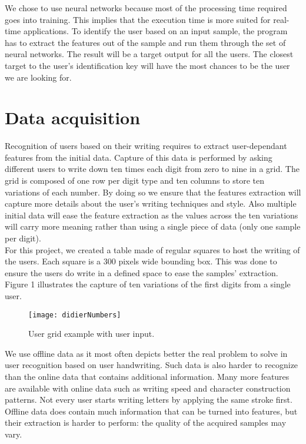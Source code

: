 \documentclass[a4paper]{article}
\begin{document}
{We chose to use neural networks because most of the processing time required goes into training. This implies that the execution time is more suited for real-time applications. To identify the user based on an input sample, the program has to extract the features out of the sample and run them through the set of neural networks. The result will be a target output for all the users. The closest target to the user's identification key will have the most chances to be the user we are looking for.

\section{Data acquisition}

Recognition of users based on their writing requires to extract user-dependant features from the initial data. Capture of this data is performed by asking different users to write down ten times each digit from zero to nine in a grid. The grid is composed of one row per digit type and ten columns to store ten variations of each number. By doing so we ensure that the features extraction will capture more details about the user’s writing techniques and style. Also multiple initial data will ease the feature extraction as the values across the ten variations will carry more meaning rather than using a single piece of data (only one sample per digit).\\

For this project, we created a table made of regular squares to host the writing of the users. Each square is a 300 pixels wide bounding box. This was done to ensure the users do write in a defined space to ease the samples' extraction. Figure 1 illustrates the capture of ten variations of the first digits from a single user.

\vspace{1mm}
\begin{figure}[h!]
  \centering
    \texttt{[image: didierNumbers]}
  \caption{User grid example with user input.}
\end{figure}

We use offline data as it most often depicts better the real problem to solve in user recognition based on user handwriting. Such data is also harder to recognize than the online data that contains additional information. Many more features are available with online data such as writing speed and character construction patterns. Not every user starts writing letters by applying the same stroke first. Offline data does contain much information that can be turned into features, but their extraction is harder to perform: the quality of the acquired samples may vary.\\

}
\end{document}

